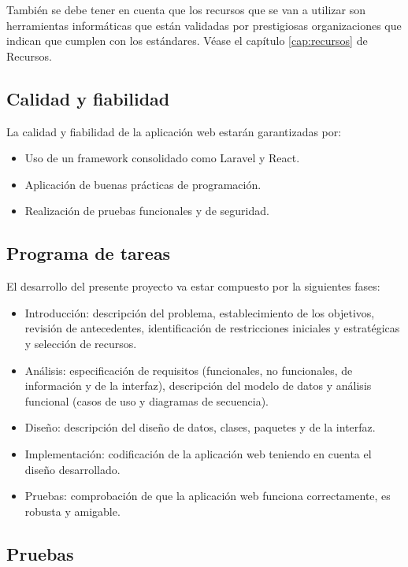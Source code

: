     También se debe tener en cuenta que los recursos  que se van a utilizar son herramientas informáticas que están validadas por prestigiosas organizaciones que indican que cumplen con los estándares. Véase el capítulo \ref{cap:recursos} de Recursos. 

\subsection{Calidad y fiabilidad}

La calidad y fiabilidad de la aplicación web estarán garantizadas por:

\begin{itemize}
    \item Uso de un framework consolidado como Laravel y React.
    \item Aplicación de buenas prácticas de programación.
    \item Realización de pruebas funcionales y de seguridad.
\end{itemize}

\subsection{Programa de tareas}

 El desarrollo del presente proyecto va estar compuesto por la siguientes fases:
 \begin{itemize}
     \item Introducción: descripción del problema, establecimiento de los objetivos, revisión de antecedentes, identificación de restricciones iniciales y estratégicas y selección de recursos.
     \item Análisis: especificación de requisitos (funcionales, no funcionales, de información y de la interfaz), descripción del modelo de datos y análisis funcional (casos de uso y diagramas de secuencia).
    
     \item Diseño: descripción del diseño de datos, clases, paquetes y de la interfaz.
    
     \item Implementación: codificación de la aplicación web teniendo en cuenta el diseño desarrollado.
    
     \item Pruebas: comprobación de que la aplicación web funciona correctamente, es robusta y amigable.
 \end{itemize}


\subsection{Pruebas}

